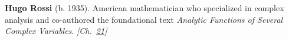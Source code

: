 \textbf{Hugo Rossi} (b. 1935). American mathematician who specialized in complex analysis and co-authored the foundational text \emph{Analytic Functions of Several Complex Variables}. \emph{[Ch.~\hyperref[ch:exponentialmapslietheory]{21}]}

